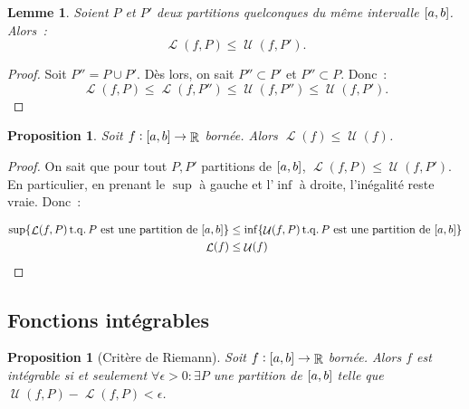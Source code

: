 \documentclass{article}
\DeclareMathOperator{\R}{\mathbb R}
\DeclareMathOperator{\tq}{ t.q. }
\DeclareMathOperator{\Larea}{\mathcal L}
\DeclareMathOperator{\Uarea}{\mathcal U}
\newcommand{\ab}{\interval ab}
\newcommand{\fabr}[1]{#1 : \ab \to \R}
\newtheorem{prp}[thm]{Proposition}
\newtheorem{lem}[thm]{Lemme}
\theoremstyle{definition}
\theoremstyle{remark}
\begin{document}
		\begin{lem} Soient $P$ et $P'$ deux partitions quelconques du même intervalle $\ab$. Alors~:
		\[\Larea(f, P) \leq \Uarea(f, P').\]
		\end{lem}

		\begin{proof} Soit $P'' = P \cup P'$. Dès lors, on sait $P'' \subset P'$ et $P'' \subset P$. Donc~:
		\[\Larea(f, P) \leq \Larea(f, P'') \leq \Uarea(f, P'') \leq \Uarea(f, P').\]
		\end{proof}

		\begin{prp} Soit $\fabr f$ bornée. Alors $\Larea(f) \leq \Uarea(f)$. \end{prp}

		\begin{proof} On sait que pour tout $P, P'$ partitions de $\ab$, $\Larea(f, P) \leq \Uarea(f, P')$. En particulier, en prenant le $\sup$
		à gauche et l'$\inf$ à droite, l'inégalité reste vraie. Donc~:
	
		\begin{align*}
			\sup \{\Larea(f, P) \tq P \text{ est une partition de } \ab\} &\leq \inf \{\Uarea(f, P) \tq P \text{ est une partition de } \ab\} \\
			\Larea(f) &\leq \Uarea(f)
		\end{align*}
		\end{proof}
	
	\subsection{Fonctions intégrables}
		\begin{prp}[Critère de Riemann] Soit $\fabr f$ bornée. Alors $f$ est intégrable si et seulement $\forall \epsilon > 0 : \exists P$ une partition
		de $\ab$ telle que $\Uarea(f, P) - \Larea(f, P) < \epsilon$. \end{prp}
\end{document}
